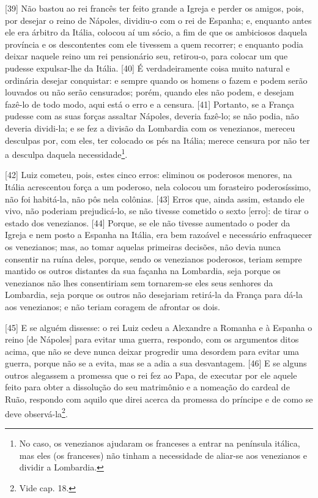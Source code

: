 {[}39{]} Não bastou ao rei francês ter feito grande a Igreja e perder os
amigos, pois, por desejar o reino de Nápoles, dividiu-o com o rei de
Espanha; e, enquanto antes ele era árbitro da Itália, colocou aí um
sócio, a fim de que os ambiciosos daquela província e os descontentes
com ele tivessem a quem recorrer; e enquanto podia deixar naquele reino
um rei pensionário seu, retirou-o, para colocar um que pudesse
expulsar-lhe da Itália. {[}40{]} É verdadeiramente coisa muito natural e
ordinária desejar conquistar: e sempre quando os homens o fazem e podem
serão louvados ou não serão censurados; porém, quando eles não podem, e
desejam fazê-lo de todo modo, aqui está o erro e a censura. {[}41{]}
Portanto, se a França pudesse com as suas forças assaltar Nápoles,
deveria fazê-lo; se não podia, não deveria dividi-la; e se fez a divisão
da Lombardia com os venezianos, mereceu desculpas por, com eles, ter
colocado os pés na Itália; merece censura por não ter a desculpa daquela
necessidade\footnote{No caso, os venezianos ajudaram os franceses a
  entrar na península itálica, mas eles (os franceses) não tinham a
  necessidade de aliar-se aos venezianos e dividir a Lombardia.}.

{[}42{]} Luiz cometeu, pois, estes cinco erros: eliminou os poderosos
menores, na Itália acrescentou força a um poderoso, nela colocou um
forasteiro poderosíssimo, não foi habitá-la, não pôs nela colônias.
{[}43{]} Erros que, ainda assim, estando ele vivo, não poderiam
prejudicá-lo, se não tivesse cometido o sexto {[}erro{]}: de tirar o
estado dos venezianos. {[}44{]} Porque, se ele não tivesse aumentado o
poder da Igreja e nem posto a Espanha na Itália, era bem razoável e
necessário enfraquecer os venezianos; mas, ao tomar aquelas primeiras
decisões, não devia nunca consentir na ruína deles, porque, sendo os
venezianos poderosos, teriam sempre mantido os outros distantes da sua
façanha na Lombardia, seja porque os venezianos não lhes consentiriam
sem tornarem-se eles seus senhores da Lombardia, seja porque os outros
não desejariam retirá-la da França para dá-la aos venezianos; e não
teriam coragem de afrontar os dois.

{[}45{]} E se alguém dissesse: o rei Luiz cedeu a Alexandre a Romanha e
à Espanha o reino {[}de Nápoles{]} para evitar uma guerra, respondo, com
os argumentos ditos acima, que não se deve nunca deixar progredir uma
desordem para evitar uma guerra, porque não se a evita, mas se a adia a
sua desvantagem. {[}46{]} E se alguns outros alegassem a promessa que o
rei fez ao Papa, de executar por ele aquele feito para obter a
dissolução do seu matrimônio e a nomeação do cardeal de Ruão, respondo
com aquilo que direi acerca da promessa do príncipe e de como se deve
observá-la\footnote{Vide cap. 18.}.

